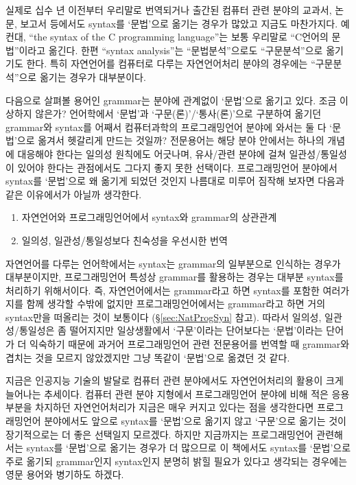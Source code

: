 실제로 십수 년 이전부터 우리말로 번역되거나 출간된 컴퓨터 관련 분야의
교과서, 논문, 보고서 등에서도 syntax를 `문법'으로 옮기는 경우가 많았고
지금도 마찬가지다. 예컨대, ``the syntax of the C programming language''는
보통 우리말로 ``C언어의 문법''이라고 옮긴다. 한편 ``syntax analysis''는
``문법분석''으로도 ``구문분석''으로 옮기기도 한다. 특히 자연언어를 컴퓨터로
다루는 자연언어처리 분야의 경우에는 ``구문분석''으로 옮기는 경우가 대부분이다.

다음으로 살펴볼 용어인 grammar는 분야에 관계없이 `문법'으로 옮기고 있다.
조금 이상하지 않은가? 언어학에서 `문법'과 `구문(론)'/`통사(론)'으로 구분하여
옮기던 grammar와 syntax를 어째서 컴퓨터과학의 프로그래밍언어 분야에 와서는
둘 다 `문법'으로 옮겨서 헷갈리게 만드는 것일까? 전문용어는 해당 분야 안에서는
하나의 개념에 대응해야 한다는 일의성 원칙에도 어긋나며, 유사/관련 분야에 걸쳐
일관성/통일성이 있어야 한다는 관점에서도 그다지 좋지 못한 선택이다.
프로그래밍언어 분야에서 syntax를 `문법'으로 왜 옮기게 되었던 것인지
나름대로 미루어 짐작해 보자면 다음과 같은 이유에서가 아닐까 생각한다.
\begin{enumerate}\tightlist
    \item 자연언어와 프로그래밍언어에서 syntax와 grammar의 상관관계
    \item 일의성, 일관성/통일성보다 친숙성을 우선시한 번역
\end{enumerate}

자연언어를 다루는 언어학에서는 syntax는 grammar의 일부분으로 인식하는 경우가
대부분이지만, 프로그래밍언어 특성상 grammar를 활용하는 경우는 대부분
syntax를 처리하기 위해서이다. 즉, 자연언어에서는 grammar라고 하면 syntax를
포함한 여러가지를 함께 생각할 수밖에 없지만 프로그래밍언어에서는 grammar라고
하면 거의 syntax만을 떠올리는 것이 보통이다 (\S\ref{sec:NatProgSyn} 참고).
따라서 일의성, 일관성/통일성은 좀 떨어지지만 일상생활에서 `구문'이라는
단어보다는 `문법'이라는 단어가 더 익숙하기 때문에 과거어 프로그래밍언어 관련
전문용어를 번역할 때 grammar와 겹치는 것을 모르지 않았겠지만 그냥 똑같이
`문법'으로 옮겼던 것 같다.

지금은 인공지능 기술의 발달로 컴퓨터 관련 분야에서도 자연언어처리의 활용이
크게 늘어나는 추세이다. 컴퓨터 관련 분야 지형에서 프로그래밍언어 분야에 비해
적은 응용 부분을 차지하던 자연언어처리가 지금은 매우 커지고 있다는 점을
생각한다면 프로그래밍언어 분야에서도 앞으로 syntax를 `문법'으로 옮기지 않고
`구문'으로 옮기는 것이 장기적으로는 더 좋은 선택일지 모르겠다. 하지만
지금까지는 프로그래밍언어 관련해서는 syntax를 `문법'으로 옮기는 경우가 더
많으므로 이 책에서도 syntax를 `문법'으로 주로 옮기되 grammar인지 syntax인지
분명히 밝힐 필요가 있다고 생각되는 경우에는 영문 용어와 병기하도 하겠다.

